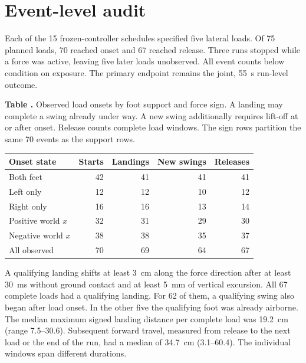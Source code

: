 \section{Event-level audit}
\label{sec:event-audit}
Each of the 15 frozen-controller schedules specified five lateral loads. Of 75 planned loads, 70 reached onset and 67 reached release. Three runs stopped while a force was active, leaving five later loads unobserved. All event counts below condition on exposure. The primary endpoint remains the joint, 55~s run-level outcome.

\begin{center}\label{tab:exposure}
\centering
\small
{\fontsize{8.7}{10.4}\selectfont\textbf{Table \thetable.} Observed load onsets by foot support and force sign. A landing may complete a swing already under way. A new swing additionally requires lift-off at or after onset. Release counts complete load windows. The sign rows partition the same 70 events as the support rows.}
\par\vspace{3pt}\fontsize{8.4}{10.2}\selectfont
\begin{tabular}{@{}lrrrr@{}}
\toprule
Onset state & Starts & Landings & New swings & Releases\\
\midrule
Both feet & 42 & 41 & 41 & 41\\
Left only & 12 & 12 & 10 & 12\\
Right only & 16 & 16 & 13 & 14\\
\midrule
Positive world $x$ & 32 & 31 & 29 & 30\\
Negative world $x$ & 38 & 38 & 35 & 37\\
\midrule
All observed & 70 & 69 & 64 & 67\\
\bottomrule
\end{tabular}
\end{center}

A qualifying landing shifts at least 3~cm along the force direction after at least 30~ms without ground contact and at least 5~mm of vertical excursion. All 67 complete loads had a qualifying landing. For 62 of them, a qualifying swing also began after load onset. In the other five the qualifying foot was already airborne. The median maximum signed landing distance per complete load was 19.2~cm (range 7.5--30.6). Subsequent forward travel, measured from release to the next load or the end of the run, had a median of 34.7~cm (3.1--60.4). The individual windows span different durations.

